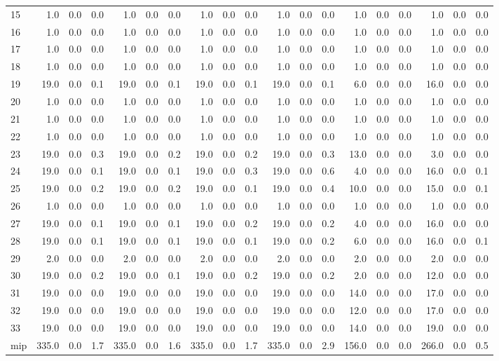 \begin{tabular}{lrrrrrrrrrrrrrrrrrr}
15 & 1.0 & 0.0 & 0.0 & 1.0 & 0.0 & 0.0 & 1.0 & 0.0 & 0.0 & 1.0 & 0.0 & 0.0 & 1.0 & 0.0 & 0.0 & 1.0 & 0.0 & 0.0 \\
16 & 1.0 & 0.0 & 0.0 & 1.0 & 0.0 & 0.0 & 1.0 & 0.0 & 0.0 & 1.0 & 0.0 & 0.0 & 1.0 & 0.0 & 0.0 & 1.0 & 0.0 & 0.0 \\
17 & 1.0 & 0.0 & 0.0 & 1.0 & 0.0 & 0.0 & 1.0 & 0.0 & 0.0 & 1.0 & 0.0 & 0.0 & 1.0 & 0.0 & 0.0 & 1.0 & 0.0 & 0.0 \\
18 & 1.0 & 0.0 & 0.0 & 1.0 & 0.0 & 0.0 & 1.0 & 0.0 & 0.0 & 1.0 & 0.0 & 0.0 & 1.0 & 0.0 & 0.0 & 1.0 & 0.0 & 0.0 \\
19 & 19.0 & 0.0 & 0.1 & 19.0 & 0.0 & 0.1 & 19.0 & 0.0 & 0.1 & 19.0 & 0.0 & 0.1 & 6.0 & 0.0 & 0.0 & 16.0 & 0.0 & 0.0 \\
20 & 1.0 & 0.0 & 0.0 & 1.0 & 0.0 & 0.0 & 1.0 & 0.0 & 0.0 & 1.0 & 0.0 & 0.0 & 1.0 & 0.0 & 0.0 & 1.0 & 0.0 & 0.0 \\
21 & 1.0 & 0.0 & 0.0 & 1.0 & 0.0 & 0.0 & 1.0 & 0.0 & 0.0 & 1.0 & 0.0 & 0.0 & 1.0 & 0.0 & 0.0 & 1.0 & 0.0 & 0.0 \\
22 & 1.0 & 0.0 & 0.0 & 1.0 & 0.0 & 0.0 & 1.0 & 0.0 & 0.0 & 1.0 & 0.0 & 0.0 & 1.0 & 0.0 & 0.0 & 1.0 & 0.0 & 0.0 \\
23 & 19.0 & 0.0 & 0.3 & 19.0 & 0.0 & 0.2 & 19.0 & 0.0 & 0.2 & 19.0 & 0.0 & 0.3 & 13.0 & 0.0 & 0.0 & 3.0 & 0.0 & 0.0 \\
24 & 19.0 & 0.0 & 0.1 & 19.0 & 0.0 & 0.1 & 19.0 & 0.0 & 0.3 & 19.0 & 0.0 & 0.6 & 4.0 & 0.0 & 0.0 & 16.0 & 0.0 & 0.1 \\
25 & 19.0 & 0.0 & 0.2 & 19.0 & 0.0 & 0.2 & 19.0 & 0.0 & 0.1 & 19.0 & 0.0 & 0.4 & 10.0 & 0.0 & 0.0 & 15.0 & 0.0 & 0.1 \\
26 & 1.0 & 0.0 & 0.0 & 1.0 & 0.0 & 0.0 & 1.0 & 0.0 & 0.0 & 1.0 & 0.0 & 0.0 & 1.0 & 0.0 & 0.0 & 1.0 & 0.0 & 0.0 \\
27 & 19.0 & 0.0 & 0.1 & 19.0 & 0.0 & 0.1 & 19.0 & 0.0 & 0.2 & 19.0 & 0.0 & 0.2 & 4.0 & 0.0 & 0.0 & 16.0 & 0.0 & 0.0 \\
28 & 19.0 & 0.0 & 0.1 & 19.0 & 0.0 & 0.1 & 19.0 & 0.0 & 0.1 & 19.0 & 0.0 & 0.2 & 6.0 & 0.0 & 0.0 & 16.0 & 0.0 & 0.1 \\
29 & 2.0 & 0.0 & 0.0 & 2.0 & 0.0 & 0.0 & 2.0 & 0.0 & 0.0 & 2.0 & 0.0 & 0.0 & 2.0 & 0.0 & 0.0 & 2.0 & 0.0 & 0.0 \\
30 & 19.0 & 0.0 & 0.2 & 19.0 & 0.0 & 0.1 & 19.0 & 0.0 & 0.2 & 19.0 & 0.0 & 0.2 & 2.0 & 0.0 & 0.0 & 12.0 & 0.0 & 0.0 \\
31 & 19.0 & 0.0 & 0.0 & 19.0 & 0.0 & 0.0 & 19.0 & 0.0 & 0.0 & 19.0 & 0.0 & 0.0 & 14.0 & 0.0 & 0.0 & 17.0 & 0.0 & 0.0 \\
32 & 19.0 & 0.0 & 0.0 & 19.0 & 0.0 & 0.0 & 19.0 & 0.0 & 0.0 & 19.0 & 0.0 & 0.0 & 12.0 & 0.0 & 0.0 & 17.0 & 0.0 & 0.0 \\
33 & 19.0 & 0.0 & 0.0 & 19.0 & 0.0 & 0.0 & 19.0 & 0.0 & 0.0 & 19.0 & 0.0 & 0.0 & 14.0 & 0.0 & 0.0 & 19.0 & 0.0 & 0.0 \\
mip & 335.0 & 0.0 & 1.7 & 335.0 & 0.0 & 1.6 & 335.0 & 0.0 & 1.7 & 335.0 & 0.0 & 2.9 & 156.0 & 0.0 & 0.0 & 266.0 & 0.0 & 0.5 \\
\bottomrule
\end{tabular}
